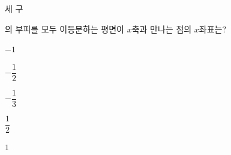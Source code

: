 세 구 \par\smallskip{}\par\smallskip\noindent 의 부피를 모두 이등분하는 평면이 $x$축과 만나는 점의 $x$좌표는?
\begin{choices32}{\rule[-3ex]{0pt}{8ex}$-1$}{\rule[-3ex]{0pt}{8ex}$-\dfrac{1}{2}$}{\rule[-3ex]{0pt}{8ex}$-\dfrac{1}{3}$}{\rule[-3ex]{0pt}{8ex}$\dfrac{1}{2}$}{\rule[-3ex]{0pt}{8ex}$1$}\end{choices32}

